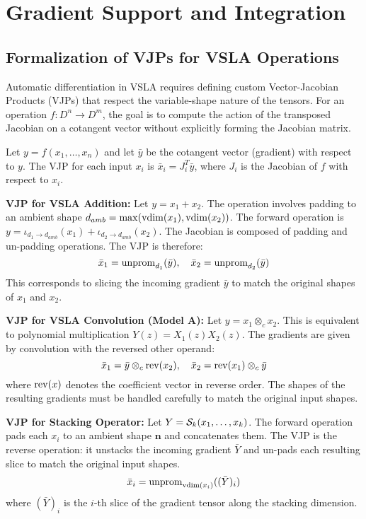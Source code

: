\section{Gradient Support and Integration}  
\label{sec:gradients}

\subsection{Formalization of VJPs for VSLA Operations}
Automatic differentiation in VSLA requires defining custom Vector-Jacobian Products (VJPs) that respect the variable-shape nature of the tensors. For an operation \(f: D^n \to D^m\), the goal is to compute the action of the transposed Jacobian on a cotangent vector without explicitly forming the Jacobian matrix.

Let \(y = f(x_1, \dots, x_n)\) and let \(\bar{y}\) be the cotangent vector (gradient) with respect to \(y\). The VJP for each input \(x_i\) is \(\bar{x}_i = J_i^T \bar{y}\), where \(J_i\) is the Jacobian of \(f\) with respect to \(x_i\).

\textbf{VJP for VSLA Addition:} Let \(y = x_1 + x_2\). The operation involves padding to an ambient shape \(d_{amb} = \max(\operatorname{vdim}(x_1), \operatorname{vdim}(x_2))\). The forward operation is \(y = \iota_{d_1 \to d_{amb}}(x_1) + \iota_{d_2 \to d_{amb}}(x_2)\). The Jacobian is composed of padding and un-padding operations. The VJP is therefore:
\[
\bar{x}_1 = \operatorname{unprom}_{d_1}(\bar{y}), \quad \bar{x}_2 = \operatorname{unprom}_{d_2}(\bar{y})
\]
This corresponds to slicing the incoming gradient \(\bar{y}\) to match the original shapes of \(x_1\) and \(x_2\).

\textbf{VJP for VSLA Convolution (Model A):} Let \(y = x_1 \otimes_c x_2\). This is equivalent to polynomial multiplication \(Y(z) = X_1(z)X_2(z)\). The gradients are given by convolution with the reversed other operand:
\[
\bar{x}_1 = \bar{y} \otimes_c \operatorname{rev}(x_2), \quad \bar{x}_2 = \operatorname{rev}(x_1) \otimes_c \bar{y}
\]
where \(\operatorname{rev}(x)\) denotes the coefficient vector in reverse order. The shapes of the resulting gradients must be handled carefully to match the original input shapes.

\textbf{VJP for Stacking Operator:} Let \(Y = \mathcal{S}_k(x_1, \dots, x_k)\). The forward operation pads each \(x_i\) to an ambient shape \(\mathbf{n}\) and concatenates them. The VJP is the reverse operation: it unstacks the incoming gradient \(\bar{Y}\) and un-pads each resulting slice to match the original input shapes.
\[
\bar{x}_i = \operatorname{unprom}_{\operatorname{vdim}(x_i)}( (\bar{Y})_i )
\]
where \((\bar{Y})_i\) is the $i$-th slice of the gradient tensor along the stacking dimension.

